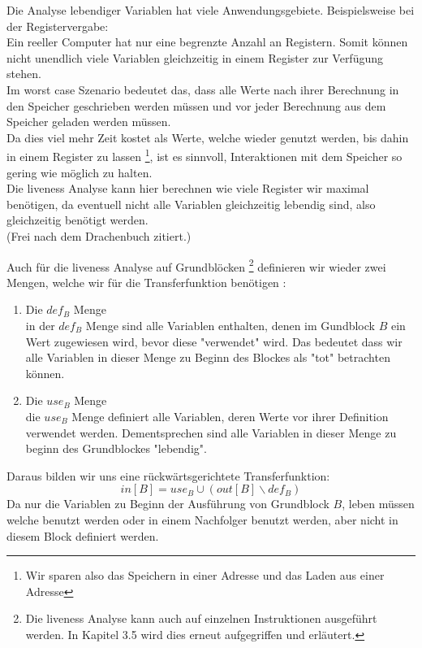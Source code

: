 Die Analyse lebendiger Variablen hat viele Anwendungsgebiete. 
Beispielsweise bei der Registervergabe:\\
Ein reeller Computer hat nur eine begrenzte Anzahl an Registern.
Somit können nicht unendlich viele Variablen gleichzeitig in einem Register zur Verfügung stehen.\\
Im worst case Szenario bedeutet das, dass alle Werte nach ihrer Berechnung
in den Speicher geschrieben werden müssen und vor jeder Berechnung aus dem
Speicher geladen werden müssen.\\
Da dies viel mehr Zeit kostet als Werte, welche wieder genutzt werden,
bis dahin in einem Register zu lassen
\footnote{Wir sparen also das Speichern in einer Adresse und das Laden aus einer Adresse},
ist es sinnvoll, Interaktionen mit dem Speicher so gering wie möglich zu halten.\\
Die liveness Analyse kann hier berechnen wie viele Register wir maximal benötigen,
da eventuell nicht alle Variablen gleichzeitig lebendig sind, also gleichzeitig benötigt werden.\\
(Frei nach dem Drachenbuch\cite[S.743-744]{D} zitiert.)

\newpage
Auch für die liveness Analyse auf Grundblöcken
\footnote{Die liveness Analyse kann auch auf einzelnen Instruktionen ausgeführt werden.
In Kapitel 3.5 wird dies erneut aufgegriffen und erläutert.}
definieren wir wieder zwei Mengen, welche wir
für die Transferfunktion benötigen \cite[S.743]{D}:

\begin{enumerate}
  \item Die $def_B$ Menge\\
    in der $def_B$ Menge sind alle Variablen enthalten, denen im Gundblock $B$ ein Wert zugewiesen wird,
    bevor diese "verwendet" wird. Das bedeutet dass wir alle Variablen in dieser Menge zu Beginn des Blockes
    als "tot" betrachten können.
  \item Die $use_B$ Menge\\
    die $use_B$ Menge definiert alle Variablen, deren Werte vor ihrer Definition verwendet werden.
    Dementsprechen sind alle Variablen in dieser Menge zu beginn des Grundblockes "lebendig".
\end{enumerate}

Daraus bilden wir uns eine rückwärtsgerichtete Transferfunktion:
\[in[B]=use_B\cup (out[B]\backslash def_B)\]
Da nur die Variablen zu Beginn der Ausführung von Grundblock $B$,
leben müssen welche benutzt werden oder in einem Nachfolger benutzt werden, 
aber nicht in diesem Block definiert werden.\\

